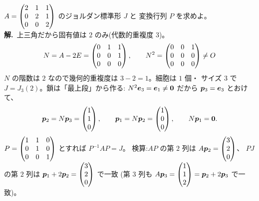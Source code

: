 \begin{rei}[例題・標準($3$ 次・細胞 $1$ 個)]\label{rei:jordan-3x3full}
$A = \begin{pmatrix}2 & 1 & 1 \\ 0 & 2 & 1 \\ 0 & 0 & 2\end{pmatrix}$ のジョルダン標準形 $J$ と
変換行列 $P$ を求めよ。\\
\textbf{解.}\ 上三角だから固有値は $2$ のみ(代数的重複度 $3$)。
\[
N = A - 2E = \begin{pmatrix}0 & 1 & 1 \\ 0 & 0 & 1 \\ 0 & 0 & 0\end{pmatrix}, \qquad
N^2 = \begin{pmatrix}0 & 0 & 1 \\ 0 & 0 & 0 \\ 0 & 0 & 0\end{pmatrix} \neq O
\]
$N$ の階数は $2$ なので幾何的重複度は $3 - 2 = 1$。細胞は $1$ 個・
サイズ $3$ で $J = J_3(2)$。鎖は「最上段」から作る:
$N^2 \bm{e}_3 = \bm{e}_1 \neq \bm{0}$ だから
$\bm{p}_3 = \bm{e}_3$ とおけて、
\[
\bm{p}_2 = N\bm{p}_3 = \begin{pmatrix}1 \\ 1 \\ 0\end{pmatrix}, \qquad
\bm{p}_1 = N\bm{p}_2 = \begin{pmatrix}1 \\ 0 \\ 0\end{pmatrix}, \qquad N\bm{p}_1 = \bm{0}.
\]
$P = \begin{pmatrix}1 & 1 & 0 \\ 0 & 1 & 0 \\ 0 & 0 & 1\end{pmatrix}$ とすれば $P^{-1}AP = J$。
検算:$AP$ の第 $2$ 列は $A\bm{p}_2 = \begin{pmatrix}3 \\ 2 \\ 0\end{pmatrix}$、
$PJ$ の第 $2$ 列は $\bm{p}_1 + 2\bm{p}_2 = \begin{pmatrix}3 \\ 2 \\ 0\end{pmatrix}$ で一致
(第 $3$ 列も $A\bm{p}_3 = \begin{pmatrix}1 \\ 1 \\ 2\end{pmatrix} = \bm{p}_2 + 2\bm{p}_3$
で一致)。
\end{rei}

